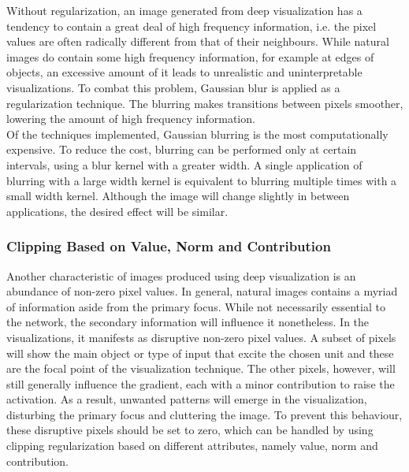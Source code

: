 Without regularization, an image generated from deep visualization has a tendency to contain a great deal of high frequency information, i.e. the pixel values are often radically different from that of their neighbours. While natural images do contain some high frequency information, for example at edges of objects, an excessive amount of it leads to unrealistic and uninterpretable visualizations. To combat this problem, Gaussian blur is applied as a regularization technique. The blurring makes transitions between pixels smoother, lowering the amount of high frequency information. \\

\noindent Of the techniques implemented, Gaussian blurring is the most computationally expensive. To reduce the cost, blurring can be performed only at certain intervals, using a blur kernel with a greater width. A single application of blurring with a large width kernel is equivalent to blurring multiple times with a small width kernel. Although the image will change slightly in between applications, the desired effect will be similar. 

\subsubsection{Clipping Based on Value, Norm and Contribution}

Another characteristic of images produced using deep visualization is an abundance of non-zero pixel values. In general, natural images contains a myriad of information aside from the primary focus. While not necessarily essential to the network, the secondary information will influence it nonetheless. In the visualizations, it manifests as disruptive non-zero pixel values. A subset of pixels will show the main object or type of input that excite the chosen unit and these are the focal point of the visualization technique. The other pixels, however, will still generally influence the gradient, each with a minor contribution to raise the activation. As a result, unwanted patterns will emerge in the visualization, disturbing the primary focus and cluttering the image. To prevent this behaviour, these disruptive pixels should be set to zero, which can be handled by using clipping regularization based on different attributes, namely value, norm and contribution. \\

